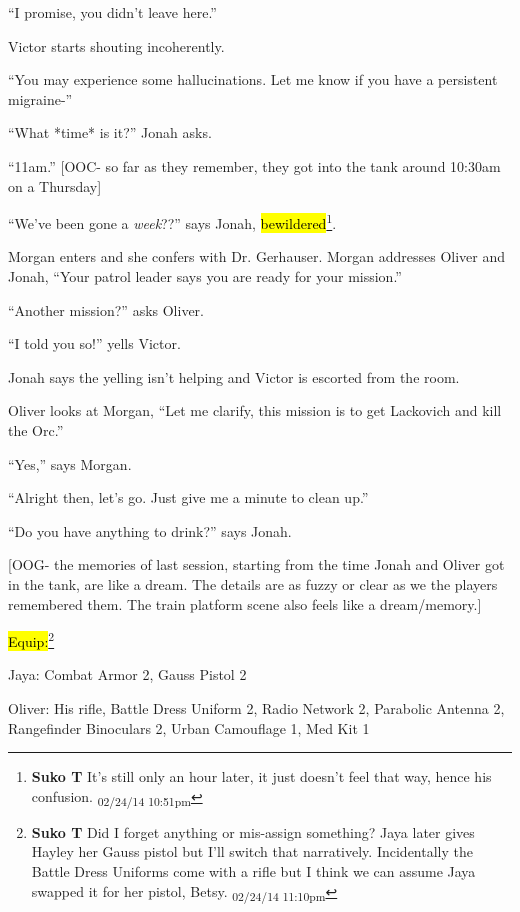 ``I promise, you didn't leave here.''

Victor starts shouting incoherently.

``You may experience some hallucinations.  Let me know if you have a persistent migraine-''

``What *time* is it?'' Jonah asks.

``11am.''  {[}OOC- so far as they remember, they got into the tank around 10:30am on a Thursday{]}

``We've been gone a \textit{week}??'' says Jonah, \hl{bewildered}\footnote{\textbf{Suko T }It's still only an hour later, it just doesn't feel that way, hence his confusion. \textsubscript{02/24/14 10:51pm}}.



Morgan enters and she confers with Dr. Gerhauser.  Morgan addresses Oliver and Jonah, ``Your patrol leader says you are ready for your mission.''

``Another mission?'' asks Oliver.

``I told you so!'' yells Victor.

Jonah says the yelling isn't helping and Victor is escorted from the room.

Oliver looks at Morgan, ``Let me clarify, this mission is to get Lackovich and kill the Orc.''

``Yes,'' says Morgan.

``Alright then, let's go.  Just give me a minute to clean up.''

``Do you have anything to drink?'' says Jonah.



{[}OOG- the memories of last session, starting from the time Jonah and Oliver got in the tank, are like a dream.  The details are as fuzzy or clear as we the players remembered them.  The train platform scene also feels like a dream/memory.{]}



\hl{Equip:}\footnote{\textbf{Suko T }Did I forget anything or mis-assign something?  Jaya later gives Hayley her Gauss pistol but I'll switch that narratively.  Incidentally the Battle Dress Uniforms come with a rifle but I think we can assume Jaya swapped it for her pistol, Betsy. \textsubscript{02/24/14 11:10pm}}

Jaya: Combat Armor 2, Gauss Pistol 2

Oliver: His rifle, Battle Dress Uniform 2, Radio Network 2, Parabolic Antenna 2, Rangefinder Binoculars 2, Urban Camouflage 1, Med Kit 1

